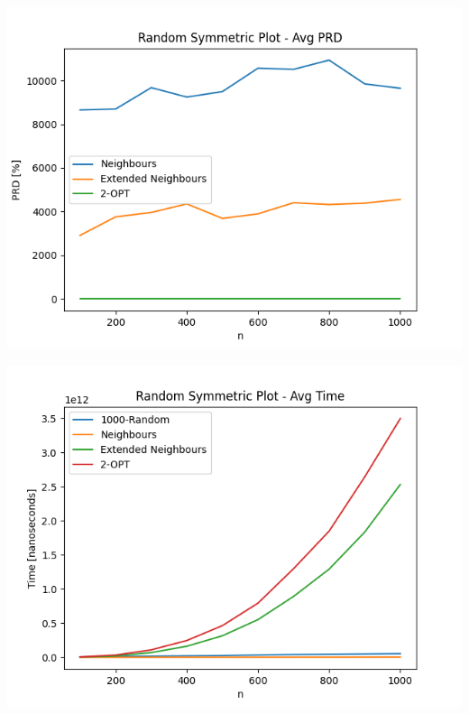\documentclass{article}
\begin{document}
\begin{center}
\includegraphics[width=\textwidth, 
                   height = 0.4\textheight, 
                   keepaspectratio]
                  {generated_sym_avg_prd_no_krandom} 
\end{center}

\begin{center}
\includegraphics[width=\textwidth, 
                   height = 0.4\textheight, 
                   keepaspectratio]
                  {generated_sym_avg_time} 
\end{center}
\end{document}
